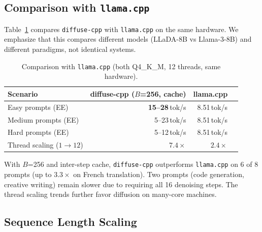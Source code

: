 \documentclass[11pt]{article}
\begin{document}
\subsection{Comparison with \texttt{llama.cpp}}

Table~\ref{tab:comparison} compares \texttt{diffuse-cpp} with \texttt{llama.cpp} on the
same hardware. We emphasize that this compares different models (LLaDA-8B vs Llama-3-8B)
and different paradigms, not identical systems.

\begin{table}[h]
\centering
\caption{Comparison with \texttt{llama.cpp} (both Q4\_K\_M, 12 threads, same hardware).}
\label{tab:comparison}
\begin{tabular}{lrrr}
\toprule
\textbf{Scenario} & \textbf{diffuse-cpp} ($B$=256, cache) & \textbf{llama.cpp} \\
\midrule
Easy prompts (EE) & \textbf{15--28}\,tok/s & 8.51\,tok/s \\
Medium prompts (EE) & 5--23\,tok/s & 8.51\,tok/s \\
Hard prompts (EE) & 5--12\,tok/s & 8.51\,tok/s \\
Thread scaling ($1 \to 12$) & $7.4\times$ & $2.4\times$ \\
\bottomrule
\end{tabular}
\end{table}

With $B$=256 and inter-step cache, \texttt{diffuse-cpp} outperforms \texttt{llama.cpp}
on 6 of 8 prompts (up to $3.3\times$ on French translation). Two prompts (code generation,
creative writing) remain slower due to requiring all 16 denoising steps. The thread
scaling trends further favor diffusion on many-core machines.


\subsection{Sequence Length Scaling}
\label{sec:seqlen}
\end{document}
